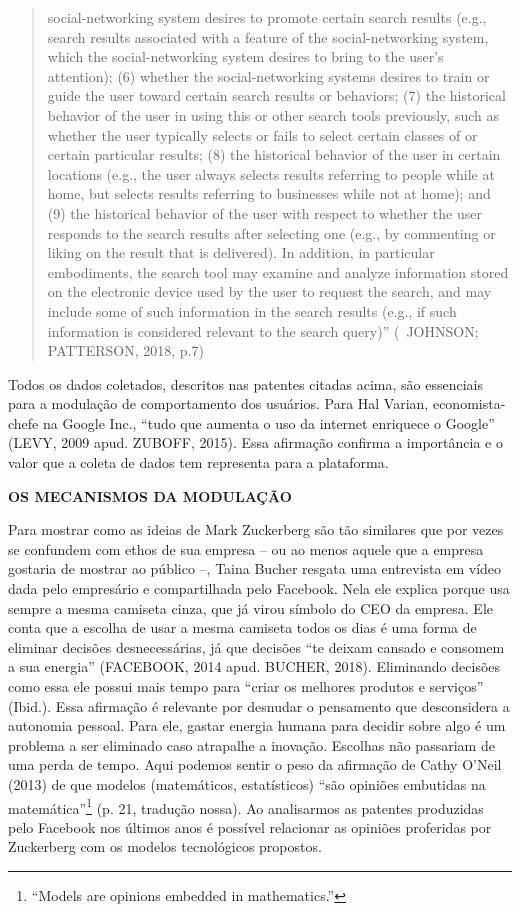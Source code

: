 \begin{quote}
{  social-networking system desires to promote certain search results
  (e.g., search results associated with a feature of the
  social-networking system, which the social-networking system desires
  to bring to the user's attention); (6) whether the social-networking
  systems desires to train or guide the user toward certain search
  results or behaviors; (7) the historical behavior of the user in using
  this or other search tools previously, such as whether the user
  typically selects or fails to select certain classes of or certain
  particular results; (8) the historical behavior of the user in certain
  locations (e.g., the user always selects results referring to people
  while at home, but selects results referring to businesses while not
  at home); and (9) the historical behavior of the user with respect to
  whether the user responds to the search results after selecting one
  (e.g., by commenting or liking on the result that is delivered). In
  addition, in particular embodiments, the search tool may examine and
  analyze information stored on the electronic device used by the user
  to request the search, and may include some of such information in the
  search results (e.g., if such information is considered relevant to
  the search query)''} (~JOHNSON; PATTERSON, 2018, p.7)
\end{quote}

Todos os dados coletados, descritos nas patentes citadas acima, são
essenciais para a modulação de comportamento dos usuários. Para Hal
Varian, economista-chefe na Google Inc., ``tudo que aumenta o uso da
internet enriquece o Google'' (LEVY, 2009 apud. ZUBOFF, 2015). Essa
afirmação confirma a importância e o valor que a coleta de dados tem
representa para a plataforma.

\textbf{OS MECANISMOS DA MODULAÇÃO}

Para mostrar como as ideias de Mark Zuckerberg são tão similares que por
vezes se confundem com ethos de sua empresa -- ou ao menos aquele que a
empresa gostaria de mostrar ao público --, Taina Bucher resgata uma
entrevista em vídeo dada pelo empresário e compartilhada pelo Facebook.
Nela ele explica porque usa sempre a mesma camiseta cinza, que já virou
símbolo do CEO da empresa. Ele conta que a escolha de usar a mesma
camiseta todos os dias é uma forma de eliminar decisões desnecessárias,
já que decisões ``te deixam cansado e consomem a sua energia''
(FACEBOOK, 2014 apud. BUCHER, 2018). Eliminando decisões como essa ele
possui mais tempo para ``criar os melhores produtos e serviços''
(Ibid.). Essa afirmação é relevante por desnudar o pensamento que
desconsidera a autonomia pessoal. Para ele, gastar energia humana para
decidir sobre algo é um problema a ser eliminado caso atrapalhe a
inovação. Escolhas não passariam de uma perda de tempo. Aqui podemos
sentir o peso da afirmação de Cathy O'Neil (2013) de que modelos
(matemáticos, estatísticos) ``são opiniões embutidas na
matemática''\footnote{``Models are opinions embedded in mathematics.''}
(p. 21, tradução nossa). Ao analisarmos as patentes produzidas pelo
Facebook nos últimos anos é possível relacionar as opiniões proferidas
por Zuckerberg com os modelos tecnológicos propostos.

